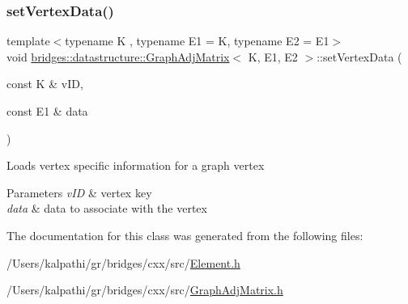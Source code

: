 \subsubsection{\texorpdfstring{setVertexData()}{setVertexData()}}
{\footnotesize\ttfamily template$<$typename K , typename E1  = K, typename E2  = E1$>$ \\
void \mbox{\hyperlink{classbridges_1_1datastructure_1_1_graph_adj_matrix}{bridges\+::datastructure\+::\+Graph\+Adj\+Matrix}}$<$ K, E1, E2 $>$\+::set\+Vertex\+Data (\begin{DoxyParamCaption}\item[{const K \&}]{v\+ID,  }\item[{const E1 \&}]{data }\end{DoxyParamCaption})\hspace{0.3cm}{\ttfamily [inline]}}

\begin{DoxyVerb}Loads vertex specific information for a graph vertex
\end{DoxyVerb}



\begin{DoxyParams}{Parameters}
{\em v\+ID} & vertex key \\
\hline
{\em data} & data to associate with the vertex \\
\hline
\end{DoxyParams}


The documentation for this class was generated from the following files\+:\begin{DoxyCompactItemize}
\item 
/\+Users/kalpathi/gr/bridges/cxx/src/\mbox{\hyperlink{_element_8h}{Element.\+h}}\item 
/\+Users/kalpathi/gr/bridges/cxx/src/\mbox{\hyperlink{_graph_adj_matrix_8h}{Graph\+Adj\+Matrix.\+h}}\end{DoxyCompactItemize}
